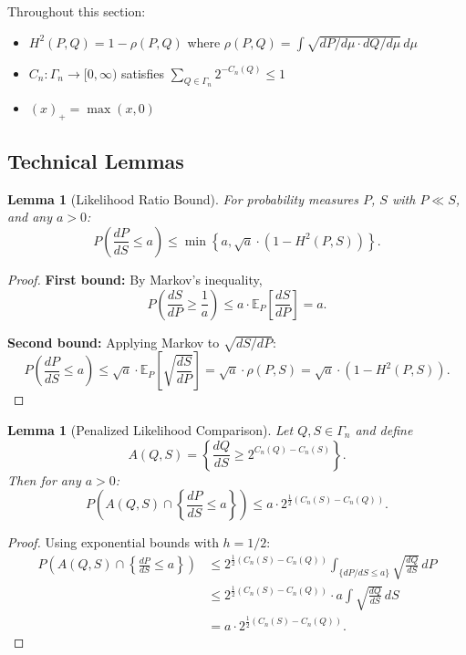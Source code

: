 \documentclass[preprint,review,12pt]{article}
\newtheorem{lemma}[theorem]{Lemma}
\begin{document}
Throughout this section:
\begin{itemize}
\item $H^2(P, Q) = 1 - \rho(P, Q)$ where 
$\rho(P, Q) = \int \sqrt{dP/d\mu \cdot dQ/d\mu} \, d\mu$
\item $C_n: \Gamma_n \to [0, \infty)$ satisfies $\sum_{Q \in \Gamma_n} 2^{-C_n(Q)} \leq 1$
\item $(x)_+ = \max(x, 0)$
\end{itemize}

\subsection{Technical Lemmas}

\begin{lemma}[Likelihood Ratio Bound]\label{lem:likelihood_bound}
For probability measures $P$, $S$ with $P \ll S$, and any $a > 0$:
\begin{equation}\label{eq:Dn_bound}
	P\left( \frac{dP}{dS} \leq a \right) \leq \min\left\{ a, \sqrt{a} \cdot (1 - H^2(P, S)) \right\}.
\end{equation}
\end{lemma}

\begin{proof}
\textbf{First bound:} By Markov's inequality,
\[
P\left( \frac{dS}{dP} \geq \frac{1}{a} \right) \leq a \cdot \mathbb{E}_P\left[ \frac{dS}{dP} \right] = a.
\]

\textbf{Second bound:} Applying Markov to $\sqrt{dS/dP}$:
\[
P\left( \frac{dP}{dS} \leq a \right) \leq \sqrt{a} \cdot \mathbb{E}_P\left[ \sqrt{\frac{dS}{dP}} \right] 
= \sqrt{a} \cdot \rho(P, S) = \sqrt{a} \cdot (1 - H^2(P, S)).
\]
\end{proof}

\begin{lemma}[Penalized Likelihood Comparison]\label{lem:comparison}
Let $Q, S \in \Gamma_n$ and define
\[
A(Q, S) = \left\{ \frac{dQ}{dS} \geq 2^{C_n(Q) - C_n(S)} \right\}.
\]
Then for any $a > 0$:
\begin{equation}\label{eq:comparison_bound}
	P\left( A(Q, S) \cap \left\{ \frac{dP}{dS} \leq a \right\} \right) 
	\leq a \cdot 2^{\frac{1}{2}(C_n(S) - C_n(Q))}.
\end{equation}
\end{lemma}

\begin{proof}
Using exponential bounds with $h = 1/2$:
\begin{align*}
	P\left( A(Q, S) \cap \left\{ \frac{dP}{dS} \leq a \right\} \right)
	&\leq 2^{\frac{1}{2}(C_n(S) - C_n(Q))} \int_{\{dP/dS \leq a\}} \sqrt{\frac{dQ}{dS}} \, dP \\
	&\leq 2^{\frac{1}{2}(C_n(S) - C_n(Q))} \cdot a \int \sqrt{\frac{dQ}{dS}} \, dS \\
	&= a \cdot 2^{\frac{1}{2}(C_n(S) - C_n(Q))}.
\end{align*}
\end{proof}
\end{document}
